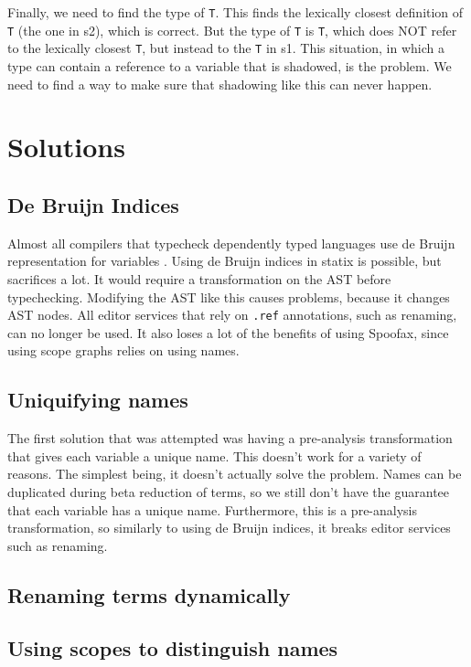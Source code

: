 Finally, we need to find the type of \verb|T|. This finds the lexically closest definition of \verb|T| (the one in s2), which is correct. But the type of \verb|T| is \verb|T|, which does NOT refer to the lexically closest \verb|T|, but instead to the \verb|T| in s1. This situation, in which a type can contain a reference to a variable that is shadowed, is the problem. We need to find a way to make sure that shadowing like this can never happen.

\section{Solutions}

\subsection{De Bruijn Indices}

Almost all compilers that typecheck dependently typed languages use de Bruijn representation for variables \cite{TODO agda lean etc}. Using de Bruijn indices in statix is possible, but sacrifices a lot. It would require a transformation on the AST before typechecking. Modifying the AST like this causes problems, because it changes AST nodes. All editor services that rely on \verb|.ref| annotations, such as renaming, can no longer be used. It also loses a lot of the benefits of using Spoofax, since using scope graphs relies on using names.

\subsection{Uniquifying names}

The first solution that was attempted was having a pre-analysis transformation that gives each variable a unique name. This doesn't work for a variety of reasons. The simplest being, it doesn't actually solve the problem. Names can be duplicated during beta reduction of terms, so we still don't have the guarantee that each variable has a unique name. Furthermore, this is a pre-analysis transformation, so similarly to using de Bruijn indices, it breaks editor services such as renaming. 

\subsection{Renaming terms dynamically}



\subsection{Using scopes to distinguish names}
